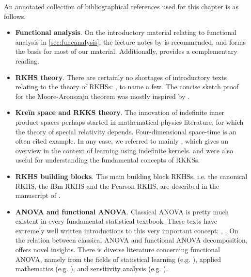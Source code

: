 \documentclass[showframe,11pt,twoside,openright]{report}
\begin{document}
An annotated collection of bibliographical references used for this chapter is as follows.
\begin{itemize}
  \item \textbf{Functional analysis}. 
  On the introductory material relating to functional analysis in \cref{sec:funcanalysis}, the lecture notes by \citet{sejdinovic2012} is recommended, and forms the basis for most of our material. 
  Additionally, \citet{rudin1987real,yamamoto2012vector,kokoszka2017introduction} provides a complementary reading.
  \item \textbf{RKHS theory}. 
  There are certainly no shortages of introductory texts relating to the theory of RKHSs: \citet{steinwart2008support,berlinet2011reproducing,gu2013smoothing}, to name a few. 
  The concise sketch proof for the Moore-Aronszajn theorem was mostly inspired by \citet[Thm. 4]{hein2004kernels}.
  \item \textbf{Kreĭn space and RKKS theory}. 
  The innovation of indefinite inner product spaces perhaps started in mathematical physics literature, for which the theory of special relativity depends. 
  Four-dimensional space-time is an often cited example. 
  In any case, we referred to mainly \citet{ong2004learning}, which gives an overview in the context of learning using indefinite kernels. 
  \citet{alpay1991some} and \citet{zafeiriou2012subspace} were also useful for understanding the fundamental concepts of RKKSs.
  \item \textbf{RKHS building blocks}. 
  The main building block RKHSs, i.e. the canonical RKHS, the fBm RKHS and the Pearson RKHS, are described in the manuscript of \citet{bergsma2017}.
  \item \textbf{ANOVA and functional ANOVA}. 
  Classical ANOVA is pretty much existent in every fundamental statistical textbook. These texts have extremely well written introductions to this very important concept: \citet[Ch. 11]{casella2002statistical}, \citet[Ch. 3]{dean1999design}. 
  On the relation between classical ANOVA and functional ANOVA decomposition, \citet{gu2013smoothing} offers novel insights. There is diverse literature concerning functional ANOVA, namely from the fields of statistical learning (e.g. \cite{wahba1990spline}), applied mathematics (e.g. \cite{kuo2010decompositions}), and sensitivity analysis (e.g. \cite{sobol2001global,durrande2013anova}). 
\end{itemize}


\hClosingStuffStandalone
\end{document}
